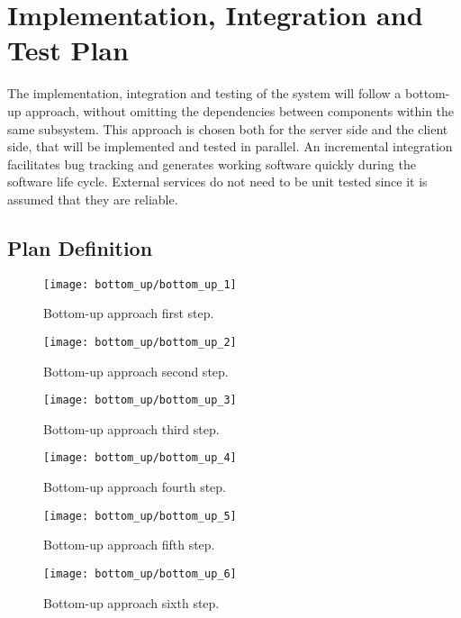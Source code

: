 \chapter{Implementation, Integration and Test Plan}
The implementation, integration and testing of the system will follow a bottom-up approach, without omitting the dependencies between components within the same subsystem. This approach is chosen both for the server side and the client side, that will be implemented and tested in parallel. An incremental integration facilitates bug tracking and generates working software quickly during the software life cycle.\newline
External services do not need to be unit tested since it is assumed that they are reliable.

\section{Plan Definition}

\begin{figure}[H]
	\centering
	\texttt{[image: bottom\_up/bottom\_up\_1]}
	\caption{Bottom-up approach first step.}
	\label{fig:bottom_up_1}
\end{figure}

\begin{figure}[H]
	\centering
	\texttt{[image: bottom\_up/bottom\_up\_2]}
	\caption{Bottom-up approach second step.}
	\label{fig:bottom_up_2}
\end{figure}

\begin{figure}[H]
	\centering
	\texttt{[image: bottom\_up/bottom\_up\_3]}
	\caption{Bottom-up approach third step.}
	\label{fig:bottom_up_3}
\end{figure}

\begin{figure}[H]
	\centering
	\texttt{[image: bottom\_up/bottom\_up\_4]}
	\caption{Bottom-up approach fourth step.}
	\label{fig:bottom_up_4}
\end{figure}

\begin{figure}[H]
	\centering
	\texttt{[image: bottom\_up/bottom\_up\_5]}
	\caption{Bottom-up approach fifth step.}
	\label{fig:bottom_up_5}
\end{figure}

\begin{figure}[H]
	\centering
	\texttt{[image: bottom\_up/bottom\_up\_6]}
	\caption{Bottom-up approach sixth step.}
	\label{fig:bottom_up_6}
\end{figure}


